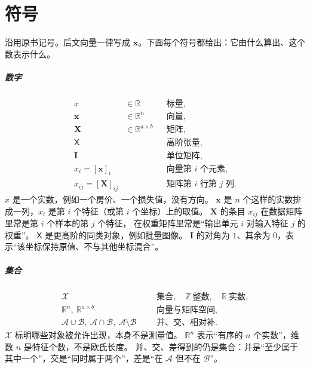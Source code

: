 \chapter*{符号}

沿用原书记号。后文向量一律写成 $\bm{x}$。下面每个符号都给出：它由什么算出、这个数表示什么。

\paragraph{数字}
\begin{align*}
x&\in\mathbb{R}
&&\text{标量},\\
\bm{x}&\in\mathbb{R}^{n}
&&\text{向量},\\
\bm{X}&\in\mathbb{R}^{a\times b}
&&\text{矩阵},\\
\mathsf{X}&&&\text{高阶张量},\\
\bm{I}&&&\text{单位矩阵},\\
x_i=[\bm{x}]_i&&&\text{向量第 $i$ 个元素},\\
x_{ij}=[\bm{X}]_{ij}&&&\text{矩阵第 $i$ 行第 $j$ 列}.
\end{align*}
$x$ 是一个实数，例如一个房价、一个损失值，没有方向。
$\bm{x}$ 是 $n$ 个这样的实数排成一列，$x_i$ 是第 $i$ 个特征（或第 $i$ 个坐标）上的取值。
$\bm{X}$ 的条目 $x_{ij}$ 在数据矩阵里常是第 $i$ 个样本的第 $j$ 个特征，
在权重矩阵里常是“输出单元 $i$ 对输入特征 $j$ 的权重”。
$\mathsf{X}$ 是更高阶的同类对象，例如批量图像。
$\bm{I}$ 的对角为 $1$、其余为 $0$，表示“该坐标保持原值、不与其他坐标混合”。

\paragraph{集合}
\begin{align*}
\mathcal{X}&&&\text{集合},\quad
\mathbb{Z}\ \text{整数},\quad
\mathbb{R}\ \text{实数},\\
\mathbb{R}^{n},\ \mathbb{R}^{a\times b}&&&\text{向量与矩阵空间},\\
\mathcal{A}\cup\mathcal{B},\
\mathcal{A}\cap\mathcal{B},\
\mathcal{A}\setminus\mathcal{B}&&&\text{并、交、相对补}.
\end{align*}
$\mathcal{X}$ 标明哪些对象被允许出现，本身不是测量值。
$\mathbb{R}^{n}$ 表示“有序的 $n$ 个实数”，维数 $n$ 是特征个数，不是欧氏长度。
并、交、差得到的仍是集合：并是“至少属于其中一个”，交是“同时属于两个”，差是“在 $\mathcal{A}$ 但不在 $\mathcal{B}$”。

